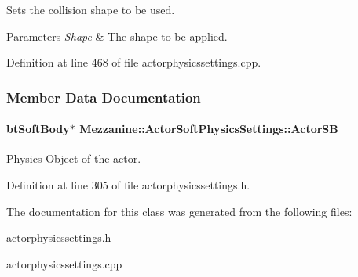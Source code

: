 Sets the collision shape to be used. 


\begin{DoxyParams}{Parameters}
{\em Shape} & The shape to be applied. \\
\hline
\end{DoxyParams}


Definition at line 468 of file actorphysicssettings.\-cpp.



\subsubsection{Member Data Documentation}
\hypertarget{classMezzanine_1_1ActorSoftPhysicsSettings_a44408487d6458ee64320be6d1283c1c0}{
\paragraph[{Actor\-S\-B}]{\setlength{\rightskip}{0pt plus 5cm}bt\-Soft\-Body$\ast$ Mezzanine\-::\-Actor\-Soft\-Physics\-Settings\-::\-Actor\-S\-B\hspace{0.3cm}{\ttfamily [protected]}}}\label{classMezzanine_1_1ActorSoftPhysicsSettings_a44408487d6458ee64320be6d1283c1c0}


\hyperlink{namespaceMezzanine_1_1Physics}{Physics} Object of the actor. 



Definition at line 305 of file actorphysicssettings.\-h.



The documentation for this class was generated from the following files\-:\begin{DoxyCompactItemize}
\item 
actorphysicssettings.\-h\item 
actorphysicssettings.\-cpp\end{DoxyCompactItemize}
